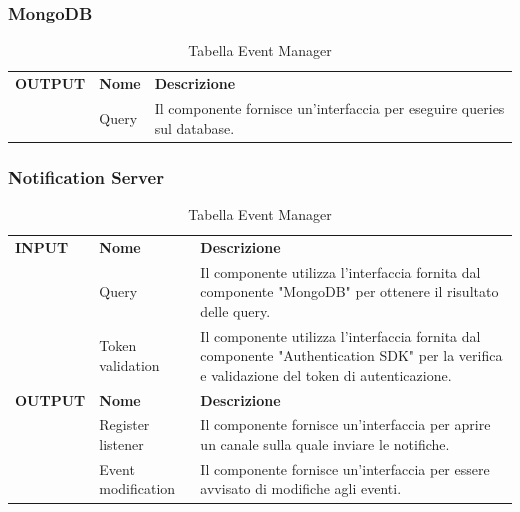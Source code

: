 \documentclass{article}
\begin{document}
\subsubsection{MongoDB}

\begin{table}[htbp]
    \centering
    \renewcommand{\arraystretch}{1.3} %
    \begin{tabularx}{\textwidth}{| l | l | X |}
        \Xhline{2pt}
        \textbf{OUTPUT} & \textbf{Nome} & \textbf{Descrizione} \\
        \Xhline{2pt}
         & Query & Il componente fornisce un'interfaccia per eseguire queries sul database. \\
        \hline
    \end{tabularx}
    \caption{Tabella Event Manager}
\end{table}

\clearpage

\subsubsection{Notification Server}

\begin{table}[htbp]
    \centering
    \renewcommand{\arraystretch}{1.3} %
    \begin{tabularx}{\textwidth}{| l | l | X |}
        \Xhline{2pt}
        \textbf{INPUT} & \textbf{Nome} & \textbf{Descrizione} \\
        \Xhline{2pt}
         & Query & Il componente utilizza l'interfaccia fornita dal componente "MongoDB" per ottenere il risultato delle query. \\
        \hline
         & Token validation & Il componente utilizza l'interfaccia fornita dal componente "Authentication SDK" per la verifica e validazione del token di autenticazione. \\
        \Xhline{2pt}
        \textbf{OUTPUT} & \textbf{Nome} & \textbf{Descrizione} \\
        \Xhline{2pt}
         & Register listener & Il componente fornisce un'interfaccia per aprire un canale sulla quale inviare le notifiche. \\
        \hline
         & Event modification & Il componente fornisce un'interfaccia per essere avvisato di modifiche agli eventi. \\
        \hline
    \end{tabularx}
    \caption{Tabella Event Manager}
\end{table}
\end{document}
